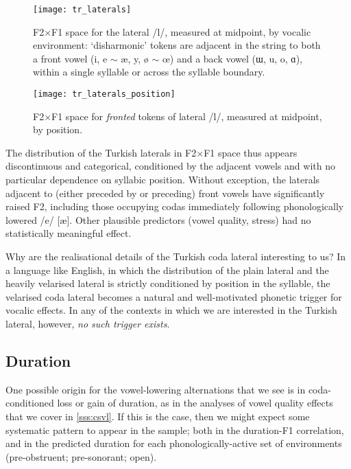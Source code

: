 \begin{figure}[ht]
  \centering
  \texttt{[image: tr\_laterals]}
  \caption[F2$\times$F1 distribution for the lateral /l/ by vocalic environment.]{F2$\times$F1 space for the lateral /l/, measured at midpoint, by vocalic environment: `disharmonic' tokens are adjacent in the string to both a front vowel (i, e $\sim$ æ, y, ø $\sim$ œ) and a back vowel (ɯ, u, o, ɑ), within a single syllable or across the syllable boundary.}
  \label{fig:trlateral}
\end{figure}

\begin{figure}[ht]
  \centering
  \texttt{[image: tr\_laterals\_position]}
  \caption[F2$\times$F1 distribution for fronted /l/ by syllabic position.]{F2$\times$F1 space for \textit{fronted} tokens of lateral /l/, measured at midpoint, by position.}
  \label{fig:trlateral_pos}
\end{figure}

The distribution of the Turkish laterals in F2$\times$F1 space thus appears discontinuous and categorical, conditioned by the adjacent vowels and with no particular dependence on syllabic position. Without exception, the laterals adjacent to (either preceded by or preceding) front vowels have significantly raised F2, including those occupying codas immediately following phonologically lowered /e/ [\ae]. Other plausible predictors (vowel quality, stress) had no statistically meaningful effect.

Why are the realisational details of the Turkish coda lateral interesting to us? In a language like English, in which the distribution of the plain lateral and the heavily velarised lateral is strictly conditioned by position in the syllable, the velarised coda lateral becomes a natural and well-motivated phonetic trigger for vocalic effects. In any of the contexts in which we are interested in the Turkish lateral, however, \emph{no such trigger exists}.

\subsection{Duration}\label{ss:trduration}

One possible origin for the vowel-lowering alternations that we see is in coda-conditioned loss or gain of duration, as in the analyses of vowel quality effects that we cover in \cref{sss:csvl}. If this is the case, then we might expect some systematic pattern to appear in the sample; both in the duration-F1 correlation, and in the predicted duration for each phonologically-active set of environments (pre-obstruent; pre-sonorant; open).

